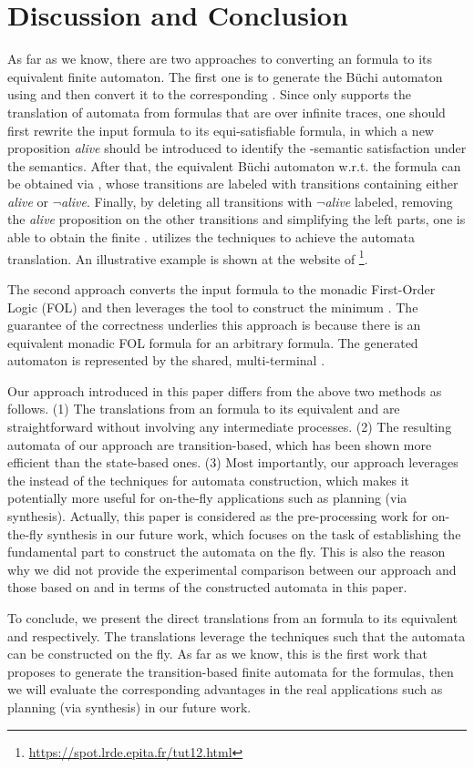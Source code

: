 \section{Discussion and Conclusion}\label{sec:discuss}
As far as we know, there are two approaches to converting an \ltlf formula to its equivalent finite automaton. The first one is to generate the B\"uchi automaton using \spot and then convert it to the corresponding \NFA. Since \spot only supports the translation of automata from \ltl formulas that are over infinite traces, one should first rewrite the input \ltlf formula to its equi-satisfiable \ltl formula, in which a new proposition \emph{alive} should be introduced to identify the \ltlf-semantic satisfaction under the \ltl semantics. After that, the equivalent B\"uchi automaton w.r.t. the \ltl formula can be obtained via \spot, whose transitions are labeled with transitions containing either \emph{alive} or \emph{$\neg$alive}. Finally, by deleting all transitions with \emph{$\neg$alive} labeled, removing the \emph{alive} proposition on the other transitions and simplifying the left parts, one is able to obtain the finite \NFA. \spot utilizes the \BDD techniques to achieve the automata translation. An illustrative example is shown at the website of \spot\footnote{\url{https://spot.lrde.epita.fr/tut12.html}}.

The second approach converts the input \ltlf formula to the monadic First-Order Logic (FOL) and then leverages the \mona tool \cite{EKM98} to construct the minimum \DFA \cite{ZTLPV17}. The guarantee of the correctness underlies this approach is because there is an equivalent monadic FOL formula for an arbitrary \ltlf formula. The generated automaton is represented by the shared, multi-terminal \BDD. 

Our approach introduced in this paper differs from the above two methods as follows. (1) The translations from an \ltlf formula to its equivalent \TNFA and \TDFA are straightforward without involving any intermediate processes. (2) The resulting automata of our approach are transition-based, which has been shown more efficient than the state-based ones. (3) Most importantly, our approach leverages the \SAT instead of the \BDD techniques for automata construction, which makes it potentially more useful for on-the-fly applications such as planning (via synthesis). Actually, this paper is considered as the pre-processing work for \ltlf on-the-fly synthesis in our future work, which focuses on the task of establishing the fundamental part to construct the automata on the fly. This is also the reason why we did not provide the experimental comparison between our approach and those based on \spot and \mona in terms of the constructed automata in this paper.

To conclude, we present the direct translations from an \ltlf formula to its equivalent \TNFA and \TDFA respectively. The translations leverage the \SAT techniques such that the automata can be constructed on the fly. As far as we know, this is the first work that proposes to generate the transition-based finite automata for the \ltlf formulas, then we will evaluate the corresponding advantages in the real applications such as planning (via synthesis) in our future work. 
